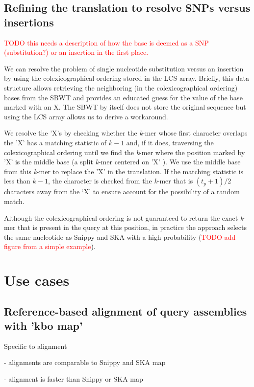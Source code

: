 \documentclass[unnumsec,webpdf,contemporary,large]{oup-authoring-template}%
\theoremstyle{thmstyleone}%
\theoremstyle{thmstyletwo}%
\theoremstyle{thmstylethree}%
\begin{document}
\subsection{Refining the translation to resolve SNPs versus insertions}
\textcolor{red}{TODO this needs a description of how the base is deemed as a SNP (substitution?) or an insertion in the first place.}

We can resolve the problem of single nucleotide substitution versus an insertion by using the colexicographical ordering stored in the LCS array\cite{alanko2023longest}. Briefly, this data structure allows retrieving the neighboring (in the colexicographical ordering) bases from the SBWT and provides an educated guess for the value of the base marked with an X. The SBWT by itself does not store the original sequence but using the LCS array allows us to derive a workaround.

We resolve the 'X's by checking whether the \emph{k}-mer whose first character overlaps the 'X' has a matching statistic of $k - 1$ and, if it does, traversing the colexicographical ordering until we find the \emph{k}-mer where the position marked by 'X' is the middle base (a split \emph{k}-mer centered on 'X' \cite{derelle2024seamless}). We use the middle base from this \emph{k}-mer to replace the 'X' in the translation. If the matching statistic is less than $k - 1$, the character is checked from the \emph{k}-mer that is $(t_p + 1)/2$ characters away from the ‘X’ to ensure account for the possibility of a random match.

Although the colexicographical ordering is not guaranteed to return the exact \emph{k}-mer that is present in the query at this position, in practice the approach selects the same nucleotide as Snippy and SKA with a high probability (\textcolor{red}{TODO add figure from a simple example}).

\section{Use cases}

\subsection{Reference-based alignment of query assemblies with 'kbo map'}

Specific to alignment

- alignments are comparable to Snippy and SKA map

- alignment is faster than Snippy or SKA map
\end{document}
